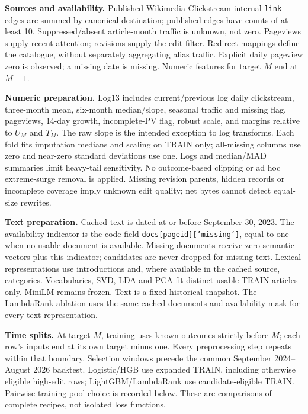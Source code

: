 \documentclass[11pt,letterpaper]{article}
\newcommand{\sect}[1]{\vspace{4pt}{\large\bfseries\color{teal}#1}\par}
\begin{document}
\newpage
\sect{5. Preprocessing and chronological validation}
\textbf{Sources and availability.} Published Wikimedia Clickstream internal \texttt{link} edges are summed by canonical destination; published edges have counts of at least 10. Suppressed/absent article-month traffic is unknown, not zero. Pageviews supply recent attention; revisions supply the edit filter. Redirect mappings define the catalogue, without separately aggregating alias traffic. Explicit daily pageview zero is observed; a missing date is missing. Numeric features for target $M$ end at $M-1$.

\textbf{Numeric preparation.} Log13 includes current/previous log daily clickstream, three-month mean, six-month median/slope, seasonal traffic and missing flag, pageviews, 14-day growth, incomplete-PV flag, robust scale, and margins relative to $U_M$ and $T_M$. The raw slope is the intended exception to log transforms. Each fold fits imputation medians and scaling on TRAIN only; all-missing columns use zero and near-zero standard deviations use one. Logs and median/MAD summaries limit heavy-tail sensitivity. No outcome-based clipping or ad hoc extreme-surge removal is applied. Missing revision parents, hidden records or incomplete coverage imply unknown edit quality; net bytes cannot detect equal-size rewrites.

\textbf{Text preparation.} Cached text is dated at or before September 30, 2023. The availability indicator is the code field \texttt{docs[pageid]['missing']}, equal to one when no usable document is available. Missing documents receive zero semantic vectors plus this indicator; candidates are never dropped for missing text. Lexical representations use introductions and, where available in the cached source, categories. Vocabularies, SVD, LDA and PCA fit distinct usable TRAIN articles only. MiniLM remains frozen. Text is a fixed historical snapshot. The LambdaRank ablation uses the same cached documents and availability mask for every text representation.

\textbf{Time splits.} At target $M$, training uses known outcomes strictly before $M$; each row's inputs end at its own target minus one. Every preprocessing step repeats within that boundary. Selection windows precede the common September 2024--August 2026 backtest. Logistic/HGB use expanded TRAIN, including otherwise eligible high-edit rows; LightGBM/LambdaRank use candidate-eligible TRAIN. Pairwise training-pool choice is recorded below. These are comparisons of complete recipes, not isolated loss functions.
\end{document}
